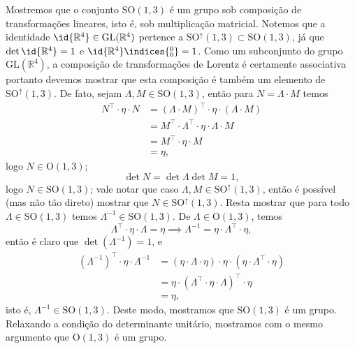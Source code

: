Mostremos que o conjunto \(\mathrm{SO}(1,3)\) é um grupo sob composição de transformações lineares, isto é, sob multiplicação matricial. Notemos que a identidade \(\id{\mathbb{R}^4} \in \mathrm{GL}(\mathbb{R}^4)\) pertence a \(\mathrm{SO}^\uparrow(1,3) \subset \mathrm{SO}(1,3)\), já que \(\det\id{\mathbb{R}^4} = 1\) e \({\id{\mathbb{R}^4}}\indices{^0_0} = 1\). Como um subconjunto do grupo \(\mathrm{GL}(\mathbb{R}^4)\), a composição de transformações de Lorentz é certamente associativa portanto devemos mostrar que esta composição é também um elemento de \(\mathrm{SO}^\uparrow(1,3)\). De fato, sejam \(\Lambda, M \in \mathrm{SO}(1,3)\), então para \(N = \Lambda \cdot M\) temos
\begin{align*}
    N^\top \cdot \eta \cdot N &= (\Lambda \cdot M)^\top \cdot \eta \cdot (\Lambda \cdot M)\\
                                  &= M^\top \cdot \Lambda^\top \cdot \eta \cdot \Lambda \cdot M\\
                                  &= M^\top \cdot \eta \cdot M\\
                                  &= \eta,
\end{align*}
logo \(N \in \mathrm{O}(1,3)\);
\begin{equation*}
    \det N = \det \Lambda \det M = 1,
\end{equation*}
logo \(N \in \mathrm{SO}(1,3)\); vale notar que caso \(\Lambda, M \in \mathrm{SO}^\uparrow(1,3)\), então é possível (mas não tão direto) mostrar que \(N \in \mathrm{SO}^\uparrow(1,3)\). Resta mostrar que para todo \(\Lambda \in \mathrm{SO}(1,3)\) temos \(\Lambda^{-1} \in \mathrm{SO}(1,3)\). De \(\Lambda \in \mathrm{O}(1,3)\), temos
\begin{equation*}
    \Lambda^\top\cdot \eta\cdot \Lambda = \eta \implies \Lambda^{-1} = \eta \cdot \Lambda^\top \cdot \eta,
\end{equation*}
então é claro que \(\det \left(\Lambda^{-1}\right) = 1\), e
\begin{align*}
    \left(\Lambda^{-1}\right)^\top \cdot \eta \cdot \Lambda^{-1} &= \left(\eta \cdot \Lambda \cdot \eta \right) \cdot \eta \cdot \left(\eta \cdot \Lambda^\top \cdot \eta\right)\\
                                                                 &= \eta \cdot \left(\Lambda^\top \cdot \eta \cdot \Lambda \right)^\top \cdot \eta\\
                                                                 &= \eta,
\end{align*}
isto é, \(\Lambda^{-1} \in \mathrm{SO}(1,3)\). Deste modo, mostramos que \(\mathrm{SO}(1,3)\) é um grupo. Relaxando a condição do determinante unitário, mostramos com o mesmo argumento que \(\mathrm{O}(1,3)\) é um grupo.

